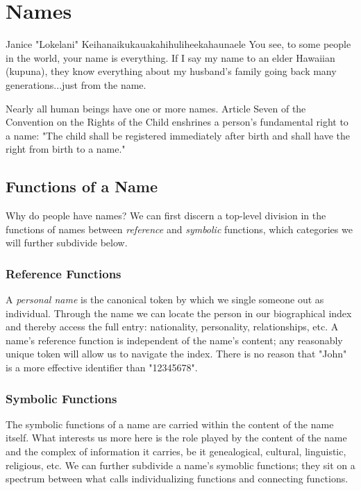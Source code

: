 \section{Names}

\begin{aquote}{Janice "Lokelani" Keihanaikukauakahihuliheekahaunaele}
You see, to some people in the world, your name is everything. If I say my name
to an elder Hawaiian (kupuna), they know everything about my husband's family
going back many generations...just from the name.
\end{aquote}

Nearly all human beings have one or more names. Article Seven of the Convention on
the Rights of the Child enshrines a person's fundamental right to a name: "The
child shall be registered immediately after birth and shall have the right from
birth to a name." \parencite{crc}

\subsection{Functions of a Name}

Why do people have names? We can first discern a top-level division in the functions
of names between \textit{reference} and \textit{symbolic} functions, which
categories we will further subdivide below.

\subsubsection{Reference Functions}

A \textit{personal name} is the canonical token by which we single someone out
as individual. Through the name we can locate the person in our biographical
index and thereby access the full entry: nationality, personality,
relationships, etc. A name's reference function is independent of the name's
content; any reasonably unique token will allow us to navigate the index. There
is no reason that "John" is a more effective identifier than "12345678".

\subsubsection{Symbolic Functions}

The symbolic functions of a name are carried within the content of the name
itself. What interests us more here is the role played by the content of the
name and the complex of information it carries, be it genealogical, cultural,
linguistic, religious, etc. We can further subdivide a name's symoblic
functions; they sit on a spectrum between what \textcite{finch08} calls
individualizing functions and connecting functions.

